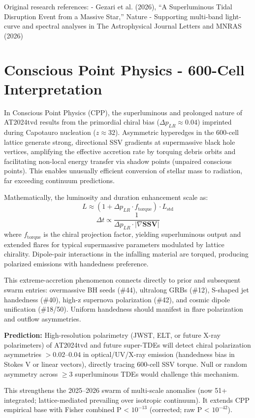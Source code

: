 \documentclass[11pt]{article}
\begin{document}
Original research references:  
- Gezari et al. (2026), ``A Superluminous Tidal Disruption Event from a Massive Star,'' Nature  
- Supporting multi-band light-curve and spectral analyses in The Astrophysical Journal Letters and MNRAS (2026)

\section{Conscious Point Physics - 600-Cell Interpretation}
In Conscious Point Physics (CPP), the superluminous and prolonged nature of AT2024tvd results from the primordial chiral bias ($\Delta p_{LR} \approx 0.04$) imprinted during Capotauro nucleation ($z \approx 32$). Asymmetric hyperedges in the 600-cell lattice generate strong, directional SSV gradients at supermassive black hole vertices, amplifying the effective accretion rate by torquing debris orbits and facilitating non-local energy transfer via shadow points (unpaired conscious points). This enables unusually efficient conversion of stellar mass to radiation, far exceeding continuum predictions.

Mathematically, the luminosity and duration enhancement scale as:  
\[
L \approx (1 + \Delta p_{LR} \cdot f_{\text{torque}}) \cdot L_{\text{std}}
\]  
\[
\Delta t \propto \frac{1}{\Delta p_{LR} \cdot |\nabla \mathbf{SSV}|}
\]  
where $f_{\text{torque}}$ is the chiral projection factor, yielding superluminous output and extended flares for typical supermassive parameters modulated by lattice chirality. Dipole-pair interactions in the infalling material are torqued, producing polarized emissions with handedness preference.

This extreme-accretion phenomenon connects directly to prior and subsequent swarm entries: overmassive BH seeds (\#44), ultralong GRBs (\#12), S-shaped jet handedness (\#40), high-z supernova polarization (\#42), and cosmic dipole unification (\#18/50). Uniform handedness should manifest in flare polarization and outflow asymmetries.

\textbf{Prediction:} High-resolution polarimetry (JWST, ELT, or future X-ray polarimeters) of AT2024tvd and future super-TDEs will detect chiral polarization asymmetries $> 0.02$--$0.04$ in optical/UV/X-ray emission (handedness bias in Stokes V or linear vectors), directly tracing 600-cell SSV torque. Null or random asymmetry across $\geq 3$ superluminous TDEs would challenge this mechanism.

This strengthens the 2025--2026 swarm of multi-scale anomalies (now 51+ integrated; lattice-mediated prevailing over isotropic continuum). It extends CPP empirical base with Fisher combined P < $10^{-13}$ (corrected; raw P < $10^{-42}$).
\end{document}
